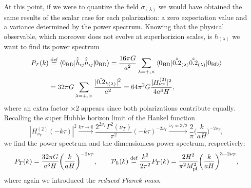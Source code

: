 At this point, if we were to quantize the field $\sigma_{(\lambda)}$ we would have obtained the same results of the scalar case for each polarization: a zero expectation value and a variance determined by the power spectrum. Knowing that the physical observable, which moreover does not evolve at superhorizion scales, is $h_{(\lambda)}$ we want to find its power spectrum
\begin{align*}
    {P}_T(k)&\stackrel{\text{def}}{=}\braket{0_\text{BD}|\hat{\tilde h}_{ij}\hat{\tilde h}_{ij}|0_\text{BD}}=\frac{16\pi G}{a^2}\sum_{\lambda=+,\times}\braket{0_\text{BD}|\hat{\tilde{0.2}}_{\mathbf(\lambda)}\hat{\tilde{0.2}}_{\mathbf(\lambda)}|0_\text{BD}} \\&=32\pi G\sum_{\lambda=+,\times}\frac{|\tilde{0.2}_{k(\lambda)}|^2}{a^2}=64\pi^2 G\frac{|H_{\nu_T}^{(2)}|^2}{4a^3H},
\end{align*}
where an extra factor $\times 2 $ appears since both polarizations contribute equally. Recalling the super Hubble horizon limit of the Hankel function
\begin{equation}
    |H_{\nu_T}^{(2)}(-k\tau)|^2\xrightarrow{k\tau\to 0}\frac{2^{2\nu_T}\Gamma^2(\nu_T)}{\pi^2}(-k\tau)^{-2\nu_T}\xrightarrow{\nu_T\approx3/2}\frac{2}{\pi}\bigg(\frac{k}{aH}\bigg)^{-2\nu_T},
\end{equation}
we find the power spectrum and the dimensionless power spectrum, respectively:
\begin{equation}
    {P}_T(k)=\frac{32\pi G}{a^3H}\bigg(\frac{k}{aH}\bigg)^{-2\nu_T},\qquad\mathcal{P}_h(k)\stackrel{\text{def}}{=}\frac{k^3}{2\pi^2}{P}_T(k)=\frac{2H^2}{\pi^2M_\text{pl}^2}\bigg(\frac{k}{aH}\bigg)^{3-2\nu_T},\label{eq:tensor_power_spectrum}
\end{equation}
where again we introduced the \textit{reduced Planck mass}.
